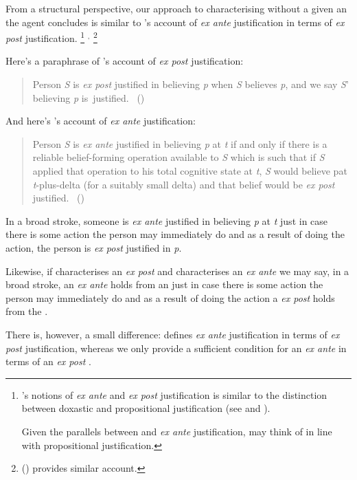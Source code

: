 \begin{note}
  From a structural perspective, our approach to characterising  without a given an  the agent concludes is similar to \citeauthor{Goldman:1979ui}'s account of \emph{ex ante} justification in terms of \emph{ex post} justification.%
  \footnote{
    \citeauthor{Goldman:1979ui}'s notions of \emph{ex ante} and \emph{ex post} justification is similar to the distinction between doxastic and propositional justification (see \cite{Firth:1978vi} and \cite[esp.\ fn.1]{Silva:2020aa}).

    Given the parallels between  and \emph{ex ante} justification, may think of  in line with propositional justification.
  }%
  \(^{,}\)%
  \footnote{
    \citeauthor{Turri:2010aa} (\citeyear{Turri:2010aa}) provides similar account.
  }

  Here's a paraphrase of \citeauthor{Goldman:1979ui}'s account of \emph{ex post} justification:
  \begin{quote}
    Person \emph{S} is \emph{ex post} justified in believing \emph{p} when \emph{S} believes \emph{p}, and we say \emph{S}' believing \emph{p} is~justified.%
    \mbox{ }\hfill\mbox{(\citeyear[Cf.][21]{Goldman:1979ui})}
  \end{quote}
  And here's \citeauthor{Goldman:1979ui}'s account of \emph{ex ante} justification:
  \begin{quote}
    Person \emph{S} is \emph{ex ante} justified in believing \emph{p} at \emph{t} if and only if there is a reliable belief-forming operation available to \emph{S} which is such that if \emph{S} applied that operation to his total cognitive state at \emph{t}, \emph{S} would believe pat \emph{t}-plus-delta (for a suitably small delta) and that belief would be \emph{ex post} justified.%
    \mbox{ }\hfill\mbox{(\citeyear[21]{Goldman:1979ui})}
  \end{quote}
  In a broad stroke, someone is \emph{ex ante} justified in believing \emph{p} at \emph{t} just in case there is some action the person may immediately do and as a result of doing the action, the person is \emph{ex post} justified in \emph{p}.

  Likewise, if \support{} characterises an \emph{ex post}  and \supportII{} characterises an \emph{ex ante}  we may say, in a broad stroke, an \emph{ex ante} \fingfr{} holds from an \agpe{} just in case there is some action the person may immediately do and as a result of doing the action a \emph{ex post} \fingfr{} holds from the \agpe{}.

  There is, however, a small difference:
  \citeauthor{Goldman:1979ui} defines \emph{ex ante} justification in terms of \emph{ex post} justification, whereas we only provide a sufficient condition for an \emph{ex ante} \fingfr{} in terms of an \emph{ex post} \fingfr{}.
\end{note}





